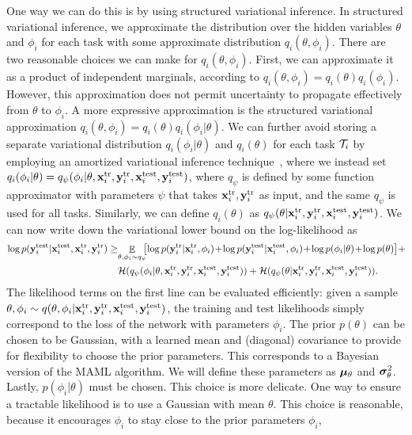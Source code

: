 \documentclass{article}
\begin{document}
One way we can do this is by using structured variational inference. In structured variational inference, we approximate the distribution over the hidden variables $\theta$ and $\phi_i$ for each task with some approximate distribution $q_i(\theta,\phi_i)$. There are two reasonable choices we can make for $q_i(\theta,\phi_i)$. First, we can approximate it as a product of independent marginals, according to $q_i(\theta,\phi_i) = q_i(\theta) q_i(\phi_i)$. However, this approximation does not permit uncertainty to propagate effectively from $\theta$ to $\phi_i$. A more expressive approximation is the structured variational approximation $q_i(\theta,\phi_i) = q_i(\theta) q_i(\phi_i | \theta)$. We can further avoid storing a separate variational distribution $q_i(\phi_i | \theta)$ and $q_i(\theta)$ for each task $\mathcal{T}_i$ by employing an amortized variational inference technique~\cite{kingma2013auto,johnson2016composing,shu2018amortized}, where we instead set $q_i(\phi_i | \theta) = q_\psi(\phi_i | \theta, \mathbf{x}^{\text{tr}}_i, \mathbf{y}^{\text{tr}}_i, \mathbf{x}^{\text{test}}_i, \mathbf{y}^{\text{test}}_i)$, where $q_\psi$ is defined by some function approximator with parameters $\psi$ that takes $\mathbf{x}^{\text{tr}}_i, \mathbf{y}^{\text{tr}}_i$ as input, and the same $q_\psi$ is used for all tasks. Similarly, we can define $q_i(\theta)$ as $q_\psi(\theta | \mathbf{x}^{\text{tr}}_i, \mathbf{y}^{\text{tr}}_i, \mathbf{x}^{\text{test}}_i, \mathbf{y}^{\text{test}}_i)$. 
We can now write down the variational lower bound on the log-likelihood as
\begin{align*}
\log p(\ytest_i | \xtest_i, \xtrain_i, \ytrain_i) \geq 
&\! \mathop{\mathbb{E}}_{\theta, \phi_i \sim q_\psi} \!\!\! \left[
\log p(\ytrain_i | \xtrain_i, \phi_i) \!+\! \log p(\ytest_i | \xtest_i, \phi_i) \!+\! \log p(\phi_i | \theta) \!+\! \log p(\theta)
\right] \!+\! \\
&\mathcal{H}(q_\psi(\phi_i | \theta, \xtrain_i, \ytrain_i, \xtest_i, \ytest_i)) + \mathcal{H}(q_\psi(\theta | \xtrain_i, \ytrain_i, \xtest_i, \ytest_i)).
\end{align*}
The likelihood terms on the first line can be evaluated efficiently: given a sample \mbox{$\theta,\phi_i \sim q(\theta,\phi_i | \mathbf{x}^{\text{tr}}_i, \mathbf{y}^{\text{tr}}_i, \mathbf{x}^{\text{test}}_i, \mathbf{y}^{\text{test}}_i)$}, the training and test likelihoods simply correspond to the loss of the network with parameters $\phi_i$.
The prior $p(\theta)$ can be chosen to be Gaussian, with a learned mean and (diagonal) covariance to provide for flexibility to choose the prior parameters. This corresponds to a Bayesian version of the MAML algorithm.
We will define these parameters as $\bm{\mu}_\theta$ and $\bm{\sigma}_\theta^2$. 
Lastly, $p(\phi_i | \theta)$ must be chosen. This choice is more delicate. One way to ensure a tractable likelihood is to use a Gaussian with mean $\theta$. This choice is reasonable, because it encourages $\phi_i$ to stay close to the prior parameters $\phi_i$, 
\end{document}
